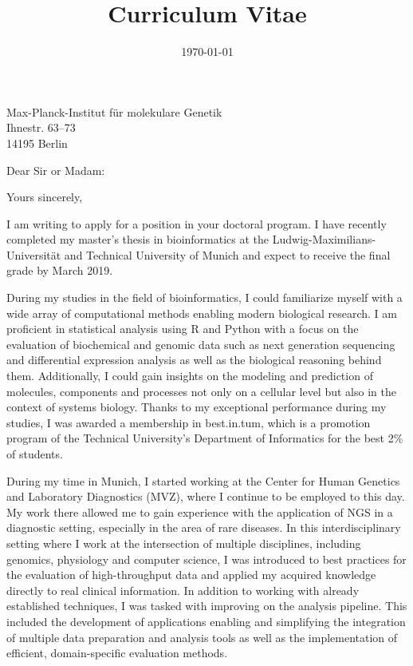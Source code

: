 \documentclass[11pt,a4paper,sans]{moderncv} %
\title{Curriculum Vitae}
\newcommand{\showletter}{}
\begin{document}

\ifdefined\showletter
\clearpage
\vspace*{-2cm}
{Max-Planck-Institut für molekulare Genetik\\
Ihnestr. 63--73\\
14195 Berlin} %
\date{\today} %
\opening{Dear Sir or Madam:} %
\closing{Yours sincerely,} %

\makelettertitle %
\justify
\thispagestyle{empty}
\enlargethispage{45pt}
\vspace{-20pt}
I am writing to apply for a position in your doctoral program.
I have recently completed my master's thesis in bioinformatics at the Ludwig-Maximilians-Universität and Technical University of Munich and expect to receive the final grade by March 2019.

During my studies in the field of bioinformatics, I could familiarize myself with a wide array of computational methods enabling modern biological research.
I am proficient in statistical analysis using R and Python with a focus on the evaluation of biochemical and genomic data such as next generation sequencing and differential expression analysis as well as the biological reasoning behind them.
Additionally, I could gain insights on the modeling and prediction of molecules, components and processes not only on a cellular level but also in the context of systems biology.
Thanks to my exceptional performance during my studies, I was awarded a membership in best.in.tum, which is a promotion program of the Technical University's Department of Informatics for the best 2\% of students.

During my time in Munich, I started working at the Center for Human Genetics and Laboratory Diagnostics (MVZ), where I continue to be employed to this day.
My work there allowed me to gain experience with the application of NGS in a diagnostic setting, especially in the area of rare diseases.
In this interdisciplinary setting where I work at the intersection of multiple disciplines, including genomics, physiology and computer science, I was introduced to best practices for the evaluation of high-throughput data and applied my acquired knowledge directly to real clinical information.
In addition to working with already established techniques, I was tasked with improving on the analysis pipeline.
This included the development of applications enabling and simplifying the integration of multiple data preparation and analysis tools as well as the implementation of efficient, domain-specific evaluation methods.
\end{document}
